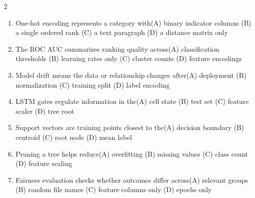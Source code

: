 \documentclass[a4paper]{article}
\begin{document}
\begin{multicols*}{2}
\begin{enumerate}[resume]
\item One-hot encoding represents a category with\newline\hspace*{0.6em}(A) binary indicator columns \quad (B) a single ordered rank \newline\hspace*{0.6em}(C) a text paragraph \quad (D) a distance matrix only
\item The ROC AUC summarizes ranking quality across\newline\hspace*{0.6em}(A) classification thresholds \quad (B) learning rates only \newline\hspace*{0.6em}(C) cluster counts \quad (D) feature encodings
\item Model drift means the data or relationship changes after\newline\hspace*{0.6em}(A) deployment \quad (B) normalization \newline\hspace*{0.6em}(C) training split \quad (D) label encoding
\item LSTM gates regulate information in the\newline\hspace*{0.6em}(A) cell state \quad (B) test set \newline\hspace*{0.6em}(C) feature scaler \quad (D) tree root
\item Support vectors are training points closest to the\newline\hspace*{0.6em}(A) decision boundary \quad (B) centroid \newline\hspace*{0.6em}(C) root node \quad (D) mean label
\item Pruning a tree helps reduce\newline\hspace*{0.6em}(A) overfitting \quad (B) missing values \newline\hspace*{0.6em}(C) class count \quad (D) feature scaling
\item Fairness evaluation checks whether outcomes differ across\newline\hspace*{0.6em}(A) relevant groups \quad (B) random file names \newline\hspace*{0.6em}(C) feature columns only \quad (D) epochs only

\end{enumerate}
\end{multicols*}
\end{document}
